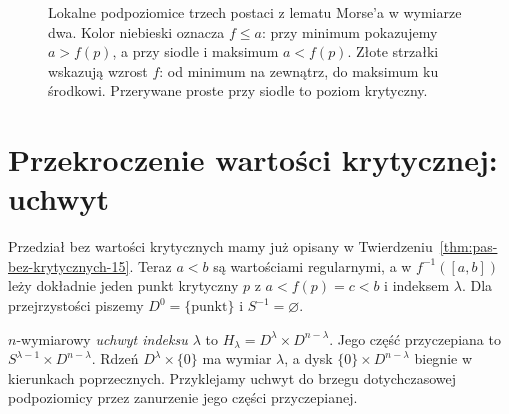 \begin{figure}[htbp]
\caption{Lokalne podpoziomice trzech postaci
z lematu Morse'a w wymiarze dwa. Kolor niebieski
oznacza $f\leq a$: przy minimum pokazujemy $a>f(p)$,
a przy siodle i maksimum $a<f(p)$. Złote strzałki
wskazują wzrost $f$: od minimum na zewnątrz,
do maksimum ku środkowi. Przerywane proste
przy siodle to poziom krytyczny.}
\label{fig:poziomice-morse-17}
\end{figure}

\section{Przekroczenie wartości krytycznej: uchwyt}
\label{sec:uchwyt-morse-17}

Przedział bez wartości krytycznych mamy już
opisany w Twierdzeniu~\ref{thm:pas-bez-krytycznych-15}.
Teraz $a<b$ są wartościami regularnymi,
a w $f^{-1}([a,b])$ leży dokładnie jeden
punkt krytyczny $p$ z $a<f(p)=c<b$ i indeksem
$\lambda$. Dla przejrzystości
piszemy $D^0=\{\mathrm{punkt}\}$
i $S^{-1}=\varnothing$.

\begin{definicja}
\label{def:uchwyt-morse-17}
$n$-wymiarowy \emph{uchwyt indeksu $\lambda$}
to $H_\lambda=D^\lambda\times D^{n-\lambda}$.
Jego część przyczepiana to
$S^{\lambda-1}\times D^{n-\lambda}$.
Rdzeń $D^\lambda\times\{0\}$ ma
wymiar $\lambda$, a dysk
$\{0\}\times D^{n-\lambda}$ biegnie
w kierunkach poprzecznych.
Przyklejamy uchwyt do brzegu
dotychczasowej podpoziomicy
przez zanurzenie jego części przyczepianej.
\end{definicja}

